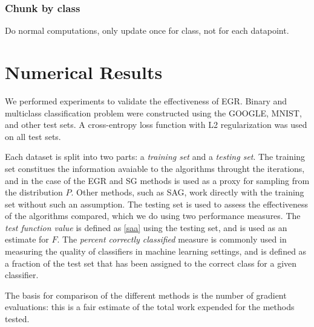 \documentclass[11pt]{article}
\begin{document}
\subsubsection{Chunk by class}
Do normal computations, only update once for class, not for each datapoint. 




\section{Numerical Results}

We performed experiments to validate the effectiveness of EGR. Binary and multiclass classification problem were constructed using the GOOGLE, MNIST, and other test sets. A cross-entropy loss function with L2 regularization was used on all test sets.

Each dataset is split into two parts: a \emph{training set} and a \emph{testing set}. The training set constitues the information avaiable to the algorithms throught the iterations, and in the case of the EGR and SG methods is used as a proxy for sampling from the distribution $P$. Other methods, such as SAG, work directly with the training set without such an assumption. The testing set is used to assess the effectiveness of the algorithms compared, which we do using two performance measures. The \emph{test function value} is defined as \eqref{saa} using the testing set, and is used as an estimate for $F$. The \emph{percent correctly classified} measure is commonly used in measuring the quality of classifiers in machine learning settings, and is defined as a fraction of the test set that has been assigned to the correct class for a given classifier.

The basis for comparison of the different methods is the number of gradient evaluations: this is a fair estimate of the total work expended for the methods tested.
\end{document}
